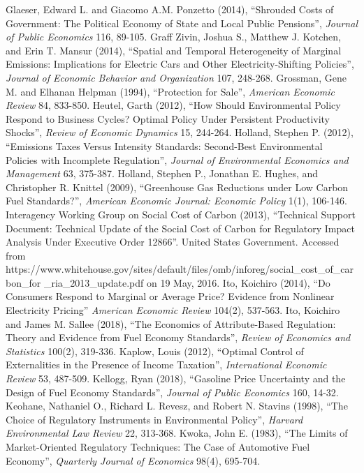 \documentclass[12pt]{article}
\begin{document}
\begin{thebibliography}{99}
\bibitem{} Glaeser, Edward L. and Giacomo A.M. Ponzetto (2014), ``Shrouded Costs of Government: The Political Economy of State and Local Public Pensions'', {\it Journal of Public Economics} 116, 89-105.
\bibitem{} Graff Zivin, Joshua S., Matthew J. Kotchen, and Erin T. Mansur (2014), ``Spatial and Temporal Heterogeneity of Marginal Emissions: Implications for Electric Cars and Other Electricity-Shifting Policies'', {\it Journal of Economic Behavior and Organization} 107, 248-268.
\bibitem{} Grossman, Gene M. and Elhanan Helpman (1994), ``Protection for Sale'', {\it American Economic Review} 84, 833-850.
\bibitem{} Heutel, Garth (2012), ``How Should Environmental Policy Respond to Business Cycles? Optimal Policy Under Persistent Productivity Shocks'', {\it Review of Economic Dynamics} 15, 244-264.
\bibitem{} Holland, Stephen P. (2012), ``Emissions Taxes Versus Intensity Standards: Second-Best Environmental Policies with Incomplete Regulation'', {\it Journal of Environmental Economics and Management} 63, 375-387.
\bibitem{} Holland, Stephen P., Jonathan E. Hughes, and Christopher R. Knittel (2009), ``Greenhouse Gas Reductions under Low Carbon Fuel Standards?'', {\it American Economic Journal: Economic Policy} 1(1), 106-146.
\bibitem{} Interagency Working Group on Social Cost of Carbon (2013), ``Technical Support Document: Technical Update of the Social Cost of Carbon for Regulatory Impact Analysis Under Executive Order 12866''. United States Government. Accessed from https://www.whitehouse.gov/sites/default/files/omb/inforeg/social\_cost\_of\_carbon\_for \_ria\_2013\_update.pdf on 19 May, 2016.
\bibitem{} Ito, Koichiro (2014), ``Do Consumers Respond to Marginal or Average Price? Evidence from Nonlinear Electricity Pricing'' {\it American Economic Review} 104(2), 537-563.
\bibitem{} Ito, Koichiro and James M. Sallee (2018), ``The Economics of Attribute-Based Regulation: Theory and Evidence from Fuel Economy Standards'', {\it Review of Economics and Statistics} 100(2), 319-336.
\bibitem{} Kaplow, Louis (2012), ``Optimal Control of Externalities in the Presence of Income Taxation'', {\it International Economic Review} 53, 487-509.
\bibitem{} Kellogg, Ryan (2018), ``Gasoline Price Uncertainty and the Design of Fuel Economy Standards'', {\it Journal of Public Economics} 160, 14-32.
\bibitem{} Keohane, Nathaniel O., Richard L. Revesz, and Robert N. Stavins (1998), ``The Choice of Regulatory Instruments in Environmental Policy'', {\it Harvard Environmental Law Review} 22, 313-368.
\bibitem{} Kwoka, John E. (1983), ``The Limits of Market-Oriented Regulatory Techniques: The Case of Automotive Fuel Economy'', {\it Quarterly Journal of Economics} 98(4), 695-704.

\end{thebibliography}
\end{document}
